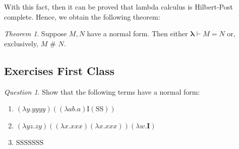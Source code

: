 \documentclass[11pt]{article}
\theoremstyle{definition}
\theoremstyle{remark}
\theoremstyle{remark}
\newtheorem{question}{Question}
\newtheorem{theorem}{Theorem}[section]
\theoremstyle{definition}
\newcommand{\dneq}{\,\, \# \,\,}
\renewcommand{\S}{\pmb{\mathrm{S}}}
\newcommand{\I}{\pmb{\mathrm{I}}}
\begin{document}
With this fact, then it can be proved that lambda calculus is Hilbert-Post
complete. Hence, we obtain the following theorem:
\begin{theorem}
  Suppose $M, N$ have a normal form. Then either $\pmb{\lambda} \vdash M=N$ or,
  exclusively, $M \dneq N$.
\end{theorem}

\subsection{Exercises First Class}
\begin{question}
  Show that the following terms have a normal form:
  \begin{enumerate}
  \item $(\lambda y.yyyy)((\lambda ab.a)\I(\S\S))$
  \item $(\lambda yz.zy)((\lambda x.xxx)(\lambda x.xxx))(\lambda w. \pmb{I})$
  \item $\S\S\S\S\S\S\S$
  \end{enumerate}
\end{question}
\end{document}
